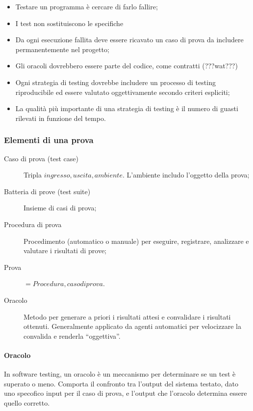 \begin{itemize}
  \item Testare un programma è cercare di farlo fallire;
  \item I test non sostituiscono le specifiche
  \item Da ogni esecuzione fallita deve essere ricavato un caso di prova da
    includere permanentemente nel progetto;
  \item Gli oracoli dovrebbero essere parte del codice, come contratti
    (???wat???)
  \item Ogni strategia di testing dovrebbe includere un processo di testing
    riproducibile ed essere valutato oggettivamente secondo criteri espliciti;
  \item La qualità più importante di una strategia di testing è il numero di
    guasti rilevati in funzione del tempo.
\end{itemize}

\subsubsection{Elementi di una prova}
\label{ssub:elementi_di_una_prova}

\begin{description}
  \item[Caso di prova (test case)] Tripla ${ingresso, uscita,
    ambiente}$. L'ambiente includo l'oggetto della prova;
  \item[Batteria di prove (test suite)] Insieme di casi di prova;
  \item[Procedura di prova] Procedimento (automatico o manuale) per eseguire,
    registrare, analizzare e valutare i risultati di prove;
  \item[Prova] $={Procedura, caso di prova}$.
  \item[Oracolo] Metodo per generare a priori i risultati attesi e convalidare i
    risultati ottenuti. Generalmente applicato  da agenti automatici per
    velocizzare la convalida e renderla ``oggettiva''.
\end{description}

\paragraph{Oracolo}
\label{par:oracolo}

In software testing, un oracolo è un meccanismo per determinare se un test è
superato o meno. Comporta il confronto tra l'output del sistema testato, dato
uno specofico input per il caso di prova, e l'output che l'oracolo determina
essere quello corretto.

